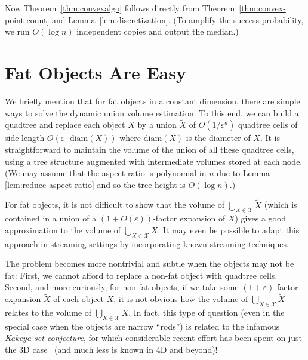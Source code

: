 \documentclass[a4paper, 11pt]{article}
\newcommand{\eps}{\varepsilon}
\newcommand{\class}[1]{\mathcal{#1}}
\begin{document}
Now Theorem~\ref{thm:convexalgo} follows directly from Theorem~\ref{thm:convex-point-count} and Lemma~\ref{lem:discretization}. (To amplify the success probability, we run $O(\log n)$ independent copies and output the median.)



\appendix

\section{Fat Objects Are Easy}
\label{sec:fat}

We briefly mention that for fat objects in a constant dimension, there are simple ways to solve the dynamic union volume estimation. To this end, we can build a quadtree and replace each object $X$ by a union $\widetilde{X}$ of $O(1/\eps^d)$ quadtree cells of side length $O(\eps \cdot \mathrm{diam}(X))$ where $\mathrm{diam}(X)$ is the diameter of $X$.  It is straightforward to maintain the volume of the union of all these quadtree cells, using a tree structure augmented with intermediate volumes stored at each node. (We may assume that the aspect ratio is polynomial in $n$ due to Lemma \ref{lem:reduce-aspect-ratio} and so the tree height is $O(\log n)$.)

For fat objects, it is not difficult to show that the volume of $\bigcup_{X\in \class{X}} \widetilde{X}$ (which is contained in a union of a $(1+O(\eps))$-factor expansion of $X$) gives a good approximation to the volume of $\bigcup_{X \in \class{X}} X$.
It may even be possible to adapt this approach in streaming settings by incorporating known streaming techniques.  

The problem becomes more nontrivial and subtle when the objects may not be fat: First, we cannot afford to replace a non-fat object with quadtree cells. Second, and more curiously, for non-fat objects, if we take some $(1+\eps)$-factor expansion $\widetilde{X}$ of each object $X$, it is not obvious how the volume of $\bigcup_{X\in \class{X}}\widetilde{X}$ relates to the volume of $\bigcup_{X\in \class{X}} X$.  In fact, this type of question (even in the special case when the objects are narrow ``rods'') is related to the infamous \emph{Kakeya set conjecture}, for which considerable recent effort has been spent on just the 3D case~\cite{WangZ25} (and much less is known in 4D and beyond)!
\end{document}
